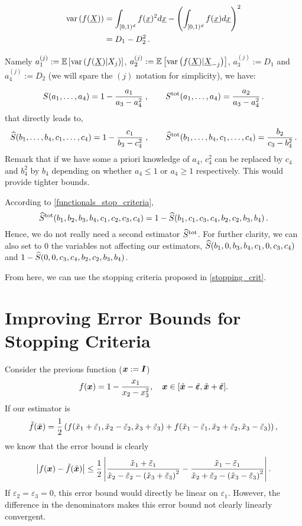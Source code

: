 \documentclass[]{amsart}
\newcommand{\tverr}{\tilde{\boldsymbol{\varepsilon}}}
\newcommand{\terr}{\tilde{\varepsilon}}
\newcommand{\vI}{\bvec{I}}
\newcommand{\tx}{\tilde{x}}
\begin{document}
\begin{align*}
\operatorname{var} \left(f(\underline{X})\right) & = \int_{[0,1)^d}f(\underline{x})^2 d \underline{x} - \left(\int_{[0,1)^d}f(\underline{x}) d \underline{x}\right)^2 \\
& = D_1 - D_2^2 \, .
\end{align*}

Namely $a_1^{(j)} :=\mathbb{E}\left[ \operatorname{var} \left(f(\underline{X})|X_j\right)\right]$, $a_2^{(j)} := \mathbb{E}\left[ \operatorname{var} \left(f(\underline{X})|\underline{X}_{-j}\right)\right]$, $a_3^{(j)} := D_1$ and $a_4^{(j)} := D_2$ (we will spare the ${(j)}$ notation for simplicity), we have:

\begin{equation}
S(a_1,\dots,a_4)=1-\frac{a_1}{a_3-a_4^2} \; , \qquad S^\textup{tot}(a_1,\dots,a_4)=\frac{a_2}{a_3-a_4^2} \, .
\end{equation}
that directly leads to,
\begin{equation}\label{functionals_stop_criteria}
\widehat{S}(b_1,\dots,b_4,c_1,\dots,c_4)=1-\frac{c_1}{b_3-c_4^2} \; , \qquad \widehat{S}^\textup{tot}(b_1,\dots,b_4,c_1,\dots,c_4)=\frac{b_2}{c_3-b_4^2} \, .
\end{equation}
Remark that if we have some a priori knowledge of $a_4$, $c_4^2$ can be replaced by $c_4$ and $b_4^2$ by $b_4$ depending on whether $a_4 \leq 1$ or $a_4 \geq 1$ respectively. This would provide tighter bounds.

According to \eqref{functionals_stop_criteria},
\begin{equation}
\widehat{S}^\textup{tot}(b_1,b_2,b_3,b_4,c_1,c_2,c_3,c_4) = 1 - \widehat{S}(b_1,c_1,c_3,c_4,b_2,c_2,b_3,b_4) \, .
\end{equation}
Hence, we do not really need a second estimator $\widehat{S}^\textup{tot}$. For further clarity, we can also set to $0$ the variables not affecting our estimators, $\widehat{S}(b_1,0,b_3,b_4,c_1,0,c_3,c_4)$ and $1-\widehat{S}(0,0,c_3,c_4,b_2,c_2,b_3,b_4)$.

From here, we can use the stopping criteria proposed in \eqref{stopping_crit}.

\section{Improving Error Bounds for Stopping Criteria}
Consider the previous function ($\vx:=\vI$)
\[
f(\vx)=1-\frac{x_1}{x_2-x_3^2},\quad \vx\in[\tvx-\tverr,\tvx+\tverr].
\]
If our estimator is 
\[
\tf(\tvx)=\frac{1}{2}\left(f(\tx_1+\terr_1,\tx_2-\terr_2,\tx_3+\terr_3)+f(\tx_1-\terr_1,\tx_2+\terr_2,\tx_3-\terr_3)\right),
\]
we know that the error bound is clearly
\begin{align*}
\abs{f(\vx)-\tf(\tvx)}\leq\frac{1}{2} \abs{\frac{\tx_1+\terr_1}{\tx_2-\terr_2-\left(\tx_3+\terr_3\right)^2}-\frac{\tx_1-\terr_1}{\tx_2+\terr_2-\left(\tx_3-\terr_3\right)^2} }.
\end{align*}
If $\varepsilon_2=\varepsilon_3=0$, this error bound would directly be linear on $\varepsilon_1$. However, the difference in the denominators makes this error bound not clearly linearly convergent.
\end{document}
